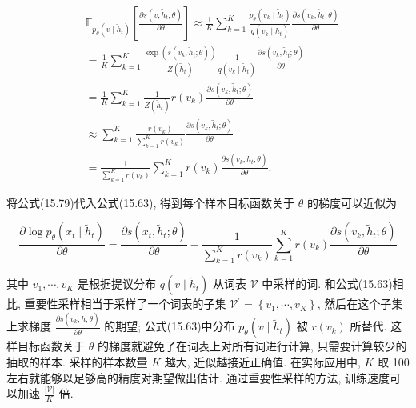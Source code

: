 \documentclass[10pt]{article}
\begin{document}
\begin{align*}
& \mathbb{E}_{p_{\theta}\left(v \mid \tilde{h}_{t}\right)}\left[\frac{\partial s\left(v, \tilde{h}_{t} ; \theta\right)}{\partial \theta}\right] \approx \frac{1}{K} \sum_{k=1}^{K} \frac{p_{\theta}\left(v_{k} \mid \tilde{h}_{t}\right)}{q\left(v_{k} \mid \tilde{h}_{t}\right)} \frac{\partial s\left(v_{k}, \tilde{h}_{t} ; \theta\right)}{\partial \theta}  \tag{15.75}\\
& =\frac{1}{K} \sum_{k=1}^{K} \frac{\exp \left(s\left(v_{k}, \tilde{h}_{t} ; \theta\right)\right)}{Z\left(\tilde{h}_{t}\right)} \frac{1}{q\left(v_{k} \mid \tilde{h}_{t}\right)} \frac{\partial s\left(v_{k}, \tilde{h}_{t} ; \theta\right)}{\partial \theta}  \tag{15.76}\\
& =\frac{1}{K} \sum_{k=1}^{K} \frac{1}{Z\left(\tilde{h}_{t}\right)} r\left(v_{k}\right) \frac{\partial s\left(v_{k}, \tilde{h}_{t} ; \theta\right)}{\partial \theta}  \tag{15.77}\\
& \approx \sum_{k=1}^{K} \frac{r\left(v_{k}\right)}{\sum_{k=1}^{K} r\left(v_{k}\right)} \frac{\partial s\left(v_{k}, \tilde{h}_{t} ; \theta\right)}{\partial \theta}  \tag{15.78}\\
& =\frac{1}{\sum_{k=1}^{K} r\left(v_{k}\right)} \sum_{k=1}^{K} r\left(v_{k}\right) \frac{\partial s\left(v_{k}, \tilde{h}_{t} ; \theta\right)}{\partial \theta} . \tag{15.79}
\end{align*}


将公式(15.79)代入公式(15.63), 得到每个样本目标函数关于 $\theta$ 的梯度可以近似为


\begin{equation*}
\frac{\partial \log p_{\theta}\left(x_{t} \mid \tilde{h}_{t}\right)}{\partial \theta}=\frac{\partial s\left(x_{t}, \tilde{h}_{t} ; \theta\right)}{\partial \theta}-\frac{1}{\sum_{k=1}^{K} r\left(v_{k}\right)} \sum_{k=1}^{K} r\left(v_{k}\right) \frac{\partial s\left(v_{k}, \tilde{h}_{t} ; \theta\right)}{\partial \theta} \tag{15.80}
\end{equation*}


其中 $v_{1}, \cdots, v_{K}$ 是根据提议分布 $q\left(v \mid \tilde{h}_{t}\right)$ 从词表 $\mathcal{V}$ 中采样的词. 和公式(15.63)相比, 重要性采样相当于采样了一个词表的子集 $\mathcal{V}^{\prime}=\left\{v_{1}, \cdots, v_{K}\right\}$, 然后在这个子集上求梯度 $\frac{\partial s\left(v_{k}, \tilde{h} ; \theta\right)}{\partial \theta}$ 的期望; 公式(15.63)中分布 $p_{\theta}\left(v \mid \tilde{h}_{t}\right)$ 被 $r\left(v_{k}\right)$ 所替代. 这样目标函数关于 $\theta$ 的梯度就避免了在词表上对所有词进行计算, 只需要计算较少的抽取的样本. 采样的样本数量 $K$ 越大, 近似越接近正确值. 在实际应用中, $K$ 取 100 左右就能够以足够高的精度对期望做出估计. 通过重要性采样的方法, 训练速度可以加速 $\frac{|\mathcal{V}|}{K}$ 倍.
\end{document}

